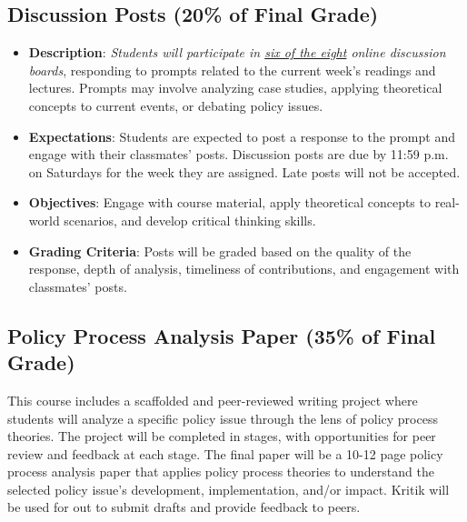 \documentclass[12pt, letterpaper]{article}
\begin{document}
\subsection*{Discussion Posts (20\% of Final Grade)} 
\begin{itemize}
    \item \textbf{Description}: \emph{Students will participate in \underline{six of the eight} online discussion boards}, responding to prompts related to the current week's readings and lectures. Prompts may involve analyzing case studies, applying theoretical concepts to current events, or debating policy issues.
    \item \textbf{Expectations}: Students are expected to post a response to the prompt and engage with their classmates' posts. Discussion posts are due by 11:59 p.m. on Saturdays for the week they are assigned. Late posts will not be accepted.
    \item \textbf{Objectives}: Engage with course material, apply theoretical concepts to real-world scenarios, and develop critical thinking skills.
    \item \textbf{Grading Criteria}: Posts will be graded based on the quality of the response, depth of analysis, timeliness of contributions, and engagement with classmates' posts.
\end{itemize}

\subsection*{Policy Process Analysis Paper (35\% of Final Grade)}

This course includes a scaffolded and peer-reviewed writing project where students will analyze a specific policy issue through the lens of policy process theories. The project will be completed in stages, with opportunities for peer review and feedback at each stage. The final paper will be a 10-12 page policy process analysis paper that applies policy process theories to understand the selected policy issue's development, implementation, and/or impact. Kritik will be used for out to submit drafts and provide feedback to peers.
\end{document}
